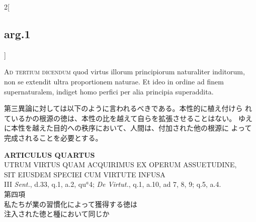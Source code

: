 \documentclass[paper=a4paper,fontsize=10pt,jafontsize=9pt,titlepage]{jlreq}
\begin{document}
\begin{paracol}{2}[\subsection{arg.1}]
\switchcolumn*[\subsection{ad.3}]

{\scshape Ad tertium dicendum} quod virtus illorum principiorum
naturaliter inditorum, non se extendit ultra proportionem naturae. Et
ideo in ordine ad finem supernaturalem, indiget homo perfici per alia
principia superaddita.

\switchcolumn

第三異論に対しては以下のように言われるべきである。本性的に植え付けら
 れているかの根源の徳は、本性の比を越えて自らを拡張させることはない。
 ゆえに本性を越えた目的への秩序において、人間は、付加された他の根源に
 よって完成されることを必要とする。

\end{paracol}
\newpage
{}
{}
\setcounter{section}{4}
\setcounter{subsection}{0}


\begin{center}
{\Large {\bfseries ARTICULUS QUARTUS}}\\
{\large UTRUM VIRTUS QUAM ACQUIRIMUS EX OPERUM ASSUETUDINE,\\SIT EIUSDEM SPECIEI CUM VIRTUTE INFUSA}\\
{\footnotesize III {\itshape Sent.}, d.33, q.1, a.2, qu$^{a}$4; {\itshape De Virtut.}, q.1, a.10, ad 7, 8, 9; q.5, a.4.}\\
{\Large 第四項\\私たちが業の習慣化によって獲得する徳は\\注入された徳と種において同じか}
\end{center}
\end{document}

